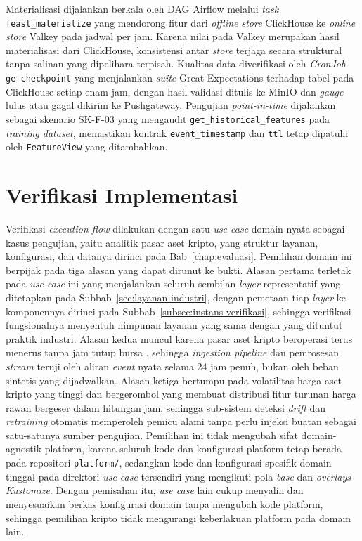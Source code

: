 Materialisasi dijalankan berkala oleh DAG Airflow melalui \textit{task} \texttt{feast\_materialize} yang mendorong fitur dari \textit{offline store} ClickHouse ke \textit{online store} Valkey pada jadwal per jam. Karena nilai pada Valkey merupakan hasil materialisasi dari ClickHouse, konsistensi antar \textit{store} terjaga secara struktural tanpa salinan yang dipelihara terpisah. Kualitas data diverifikasi oleh \textit{CronJob} \texttt{ge-checkpoint} yang menjalankan \textit{suite} Great Expectations terhadap tabel pada ClickHouse setiap enam jam, dengan hasil validasi ditulis ke MinIO dan \textit{gauge} lulus atau gagal dikirim ke Pushgateway. Pengujian \textit{point-in-time} dijalankan sebagai skenario SK-F-03 yang mengaudit \texttt{get\_historical\_features} pada \textit{training dataset}, memastikan kontrak \texttt{event\_timestamp} dan \texttt{ttl} tetap dipatuhi oleh \texttt{FeatureView} yang ditambahkan.

\section{Verifikasi Implementasi}
\label{sec:verifikasi}

Verifikasi \textit{execution flow} dilakukan dengan satu \textit{use case} domain nyata sebagai kasus pengujian, yaitu analitik pasar aset kripto, yang struktur layanan, konfigurasi, dan datanya dirinci pada Bab~\ref{chap:evaluasi}. Pemilihan domain ini berpijak pada tiga alasan yang dapat dirunut ke bukti. Alasan pertama terletak pada \textit{use case} ini yang menjalankan seluruh sembilan \textit{layer} representatif yang ditetapkan pada Subbab~\ref{sec:layanan-industri}, dengan pemetaan tiap \textit{layer} ke komponennya dirinci pada Subbab~\ref{subsec:instans-verifikasi}, sehingga verifikasi fungsionalnya menyentuh himpunan layanan yang sama dengan yang dituntut praktik industri. Alasan kedua muncul karena pasar aset kripto beroperasi terus menerus tanpa jam tutup bursa \autocite{makarov2020trading}, sehingga \textit{ingestion pipeline} dan pemrosesan \textit{stream} teruji oleh aliran \textit{event} nyata selama 24 jam penuh, bukan oleh beban sintetis yang dijadwalkan. Alasan ketiga bertumpu pada volatilitas harga aset kripto yang tinggi dan bergerombol \autocite{katsiampa2017volatility} yang membuat distribusi fitur turunan harga rawan bergeser dalam hitungan jam, sehingga sub-sistem deteksi \textit{drift} dan \textit{retraining} otomatis memperoleh pemicu alami tanpa perlu injeksi buatan sebagai satu-satunya sumber pengujian. Pemilihan ini tidak mengubah sifat domain-agnostik platform, karena seluruh kode dan konfigurasi platform tetap berada pada repositori \texttt{platform/}, sedangkan kode dan konfigurasi spesifik domain tinggal pada direktori \textit{use case} tersendiri yang mengikuti pola \textit{base} dan \textit{overlays} \textit{Kustomize}. Dengan pemisahan itu, \textit{use case} lain cukup menyalin dan menyesuaikan berkas konfigurasi domain tanpa mengubah kode platform, sehingga pemilihan kripto tidak mengurangi keberlakuan platform pada domain lain.

